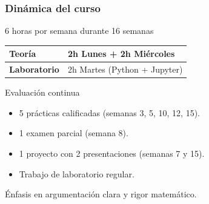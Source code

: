 \begin{frame}
	\frametitle{Dinámica del curso}

	\begin{block}{6 horas por semana durante 16 semanas}
		\begin{table}[ht!]
			\centering
			\begin{tabular}{|l|l|}
				\hline
				\textbf{Teoría}      & 2h Lunes + 2h Miércoles      \\[0.1cm]
				\hline
				\textbf{Laboratorio} & 2h Martes (Python + Jupyter) \\[0.1cm]
				\hline
			\end{tabular}
		\end{table}
	\end{block}

	\begin{block}{Evaluación continua}
		\begin{itemize}
			\item 5 prácticas calificadas (semanas 3, 5, 10, 12, 15).
			\item 1 examen parcial (semana 8).
			\item 1 proyecto con 2 presentaciones (semanas 7 y 15).
			\item Trabajo de laboratorio regular.
		\end{itemize}
		\small Énfasis en argumentación clara y rigor matemático.
	\end{block}
\end{frame}

